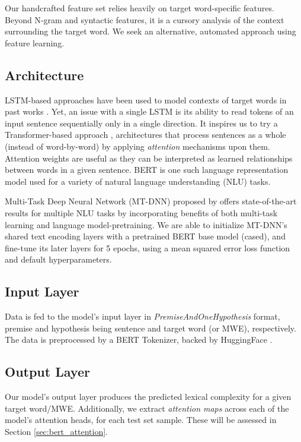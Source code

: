 \documentclass{dcthesis}
\theoremstyle{definition}
\theoremstyle{remark}
\begin{document}
Our handcrafted feature set relies heavily on target word-specific features. Beyond N-gram and syntactic features, it is a cursory analysis of the context surrounding the target word. We seek an alternative, automated approach using feature learning.

\subsection{Architecture}

LSTM-based approaches have been used to model contexts of target words in past works \citep{hartmanndossantos2018nilc, dehertogtack2018deep}. Yet, an issue with a single LSTM is its ability to read tokens of an input sentence sequentially only in a single direction. It inspires us to try a Transformer-based approach \citep{DBLP:journals/corr/VaswaniSPUJGKP17}, architectures that process sentences as a whole (instead of word-by-word) by applying \textit{attention} mechanisms upon them. Attention weights are useful as they can be interpreted as learned relationships between words in a given sentence. BERT \citep{DBLP:journals/corr/abs-1810-04805} is one such language representation model used for a variety of natural language understanding (NLU) tasks.

Multi-Task Deep Neural Network (MT-DNN) proposed by \citet{liuetal2019multitask} offers state-of-the-art results for multiple NLU tasks by incorporating benefits of both multi-task learning and language model-pretraining. We are able to initialize MT-DNN's shared text encoding layers with a pretrained BERT base model (cased), and fine-tune its later layers for 5 epochs, using a mean squared error loss function and default hyperparameters.

\subsection{Input Layer}

Data is fed to the model's input layer in \textit{PremiseAndOneHypothesis} format, premise and hypothesis being sentence and target word (or MWE), respectively. The data is preprocessed by a BERT Tokenizer, backed by HuggingFace \citep{wolf_etal_2020_transformers}.

\subsection{Output Layer}

Our model's output layer produces the predicted lexical complexity for a given target word/MWE. Additionally, we extract \textit{attention maps} across each of the model's attention heads, for each test set sample. These will be assessed in Section \ref{sec:bert_attention}.
\end{document}
